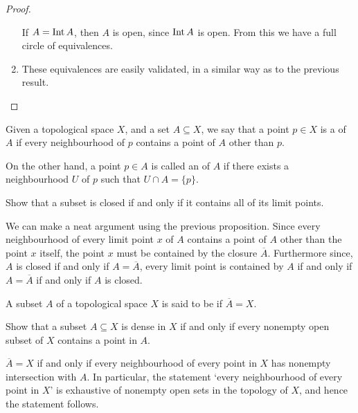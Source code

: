 \begin{proposition}
\begin{proof}
\begin{enumerate}
			      If $ A = \operatorname{Int}{A} $, then $ A $ is open, since $ \operatorname{Int}{A} $ is open. From this we have a full circle of equivalences.

			\item These equivalences are easily validated, in a similar way as to the previous result.
		\end{enumerate}
	\end{proof}
\end{proposition}

\begin{definition}
	Given a topological space $ X $, and a set $ A \subseteq X $, we say that a point $ p \in X $ is a  of $ A $ if every neighbourhood of $ p $ contains a point of $ A $ other than $ p $.

	On the other hand, a point $ p \in A $ is called an  of $ A $ if there exists a neighbourhood $ U $  of $ p $ such that $ U \cap A = \{ p \} $.
\end{definition}

\begin{exercise}
	\begin{problem}
	Show that a subset is closed if and only if it contains all of its limit points.
	\end{problem}
	\begin{solution}
		We can make a neat argument using the previous proposition. Since every neighbourhood of every limit point $ x $ of $ A $ contains a point of $ A $ other than the point $ x $ itself, the point $ x $ must be contained by the closure $ \overline{A} $. Furthermore since, $ A $ is closed if and only if $ A = \overline{A} $, every limit point is contained by $ A $ if and only if $ A = \overline{A} $ if and only if $ A $ is closed.
	\end{solution}
\end{exercise}

\begin{definition}[Dense]
	A subset $ A $ of a topological space $ X $ is said to be  if $ \overline{A} = X $.
\end{definition}

\begin{exercise}
	\begin{problem}
	Show that a subset $ A \subseteq X $ is dense in $ X $ if and only if every nonempty open subset of $ X $ contains a point in $ A $.
	\end{problem}
	\begin{solution}
		$ \overline{A} = X $ if and only if every neighbourhood of every point in $ X $ has nonempty intersection with $ A $. In particular, the statement `every neighbourhood of every point in $ X $' is exhaustive of nonempty open sets in the topology of $ X $, and hence the statement follows.
	\end{solution}
\end{exercise}

